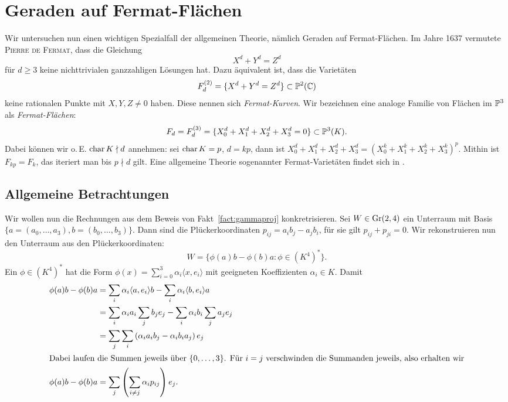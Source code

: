 \chapter{Geraden auf Fermat-Flächen} \label{chap:fermat}
Wir untersuchen nun einen wichtigen Spezialfall der allgemeinen Theorie, nämlich Geraden auf Fermat-Flächen. Im Jahre 1637 vermutete \textsc{Pierre de Fermat}, dass die Gleichung
\begin{equation*}
X^d + Y^d = Z^d
\end{equation*}
für $d \geq 3$ keine nichttrivialen ganzzahligen Lösungen hat. Dazu äquivalent ist, dass die Varietäten
\begin{equation*}
F_d^{(2)} = \{ X^d + Y^d = Z^d \} \subset \mathbb P^{2}(\mathbb C)
\end{equation*}
keine rationalen Punkte mit $X, Y, Z \neq 0$ haben. Diese nennen sich \emph{Fermat-Kurven}. Wir bezeichnen eine analoge Familie von Flächen im $\mathbb P^{3}$ als \emph{Fermat-Flächen}:
\begin{equation}
F_d = F_d^{(3)} = \{ X_0^d + X_1^d + X_2^d + X_3^d = 0 \} \subset \mathbb P^{3}(K).
\end{equation}
Dabei können wir o.\,E. $\operatorname{char} K \nmid d$ annehmen: sei $\operatorname{char} K = p$, $d = kp$, dann ist $X_0^d + X_1^d + X_2^d + X_3^d = (X_0^k + X_1^k + X_2^k + X_3^k)^p$. Mithin ist $F_{kp} = F_k$, das iteriert man bis $p \nmid d$ gilt. Eine allgemeine Theorie sogenannter Fermat-Varietäten findet sich in \cite{Fermat}.

\section{Allgemeine Betrachtungen}
Wir wollen nun die Rechnungen aus dem Beweis von Fakt~\ref{fact:gammaproj} konkretrisieren. Sei $W \in \grass 2/4$ ein Unterraum mit Basis $\{a = (a_0, \dots, a_3), b = (b_0, \dots, b_3)\}$. Dann sind die Plückerkoordinaten $p_{ij} = a_i b_j - a_j b_i$, für sie gilt $p_{ij} + p_{ji} = 0$. Wir rekonstruieren nun den Unterraum aus den Plückerkoordinaten:
\begin{equation}
W = \{ \phi(a)b - \phi(b)a \colon \phi \in (K^4)^* \}.
\end{equation}
Ein $\phi \in (K^4)^*$ hat die Form $\phi(x) = \sum_{i=0}^3 \alpha_i \langle x, e_i \rangle$ mit geeigneten Koeffizienten $\alpha_i \in K$. Damit
\begin{align*}
\phi(a)b - \phi(b)a &= \sum_i \alpha_i \langle a, e_i \rangle b - \sum_i \alpha_i \langle b, e_i \rangle a \\
	&= \sum_i \alpha_i a_i \sum_j b_j e_j - \sum_i \alpha_i b_i \sum_j a_j e_j \\
	&= \sum_j \sum_i \left(\alpha_i a_i b_j - \alpha_i b_i a_j \right) e_j \\
\intertext{Dabei laufen die Summen jeweils über $\{0,\dots,3\}$. Für $i=j$ verschwinden die Summanden jeweils, also erhalten wir}
\phi(a)b - \phi(b)a &= \sum_j \left(\sum_{i \neq j} \alpha_i p_{ij} \right) e_j.
\end{align*}

